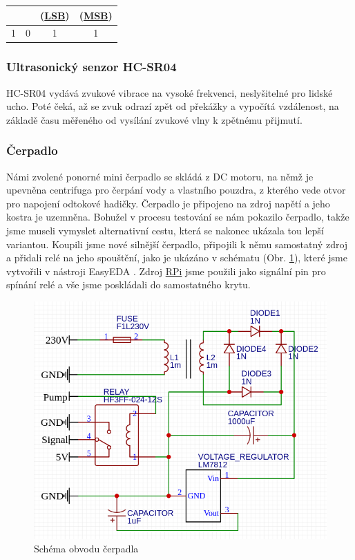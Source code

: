 \documentclass[czech,12pt,a4paper]{article}
\begin{document}
\begin{center}
	\begin{tabular}{ |c|c|c|c| } 
		\hline
		& & (\underline{\ac{LSB}}) & (\underline{\ac{MSB}}) \\ 
		\hline
		1 & 0 & 1 & 1 \\ 
		\hline
	\end{tabular}
\end{center}

\subsubsection{Ultrasonický senzor HC-SR04}

\ac{HC-SR04} vydává zvukové vibrace na vysoké frekvenci, neslyšitelné pro lidské ucho. Poté čeká, až se zvuk odrazí zpět od překážky a vypočítá vzdálenost, na základě času měřeného od vysílání zvukové vlny k zpětnému přijmutí.

\subsubsection{Čerpadlo}

Námi zvolené ponorné mini čerpadlo se skládá z DC motoru, na němž je upevněna centrifuga pro čerpání vody a vlastního pouzdra, z kterého vede otvor pro napojení odtokové hadičky. Čerpadlo je připojeno na zdroj napětí a jeho kostra je uzemněna. Bohužel v procesu testování se nám pokazilo čerpadlo, takže jsme museli vymyslet alternativní cestu, která se nakonec ukázala tou lepší variantou. Koupili jsme nové silnější čerpadlo, připojili k němu samostatný zdroj a přidali relé na jeho spouštění, jako je ukázáno v schématu (Obr. \ref{fig:schema-obvodu-cerpadla}), které jsme vytvořili v nástroji EasyEDA \cite{easyeda}. Zdroj \underline{\ac{RPi}} jsme použili jako signální pin pro spínání relé a vše jsme poskládali do samostatného krytu.

\vspace*{1cm}
\begin{figure}[h]
	\centering
	\includegraphics[width=0.67\linewidth]{pump-schema.png}
	\caption{Schéma obvodu čerpadla}
	\label{fig:schema-obvodu-cerpadla}
\end{figure}
\end{document}
